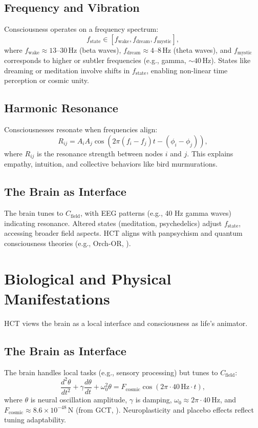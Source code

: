 \documentclass[a4paper,12pt]{article}
\begin{document}
\subsection{Frequency and Vibration}
Consciousness operates on a frequency spectrum:
\begin{equation}
f_{\text{state}} \in [f_{\text{wake}}, f_{\text{dream}}, f_{\text{mystic}}],
\label{eq:freq_spectrum}
\end{equation}
where $f_{\text{wake}} \approx 13\text{--}30 \, \text{Hz}$ (beta waves), $f_{\text{dream}} \approx 4\text{--}8 \, \text{Hz}$ (theta waves), and $f_{\text{mystic}}$ corresponds to higher or subtler frequencies (e.g., gamma, $\sim 40 \, \text{Hz}$). States like dreaming or meditation involve shifts in $f_{\text{state}}$, enabling non-linear time perception or cosmic unity.

\subsection{Harmonic Resonance}
Consciousnesses resonate when frequencies align:
\begin{equation}
R_{ij} = A_i A_j \cos(2\pi (f_i - f_j) t - (\phi_i - \phi_j)),
\label{eq:resonance}
\end{equation}
where $R_{ij}$ is the resonance strength between nodes $i$ and $j$. This explains empathy, intuition, and collective behaviors like bird murmurations.

\subsection{The Brain as Interface}
The brain tunes to $C_{\text{field}}$, with EEG patterns (e.g., 40 Hz gamma waves) indicating resonance. Altered states (meditation, psychedelics) adjust $f_{\text{state}}$, accessing broader field aspects. HCT aligns with panpsychism and quantum consciousness theories (e.g., Orch-OR, \cite{PenroseHameroff1996}).

\section{Biological and Physical Manifestations}
\label{sec:bio_phys}
HCT views the brain as a local interface and consciousness as life’s animator.

\subsection{The Brain as Interface}
The brain handles local tasks (e.g., sensory processing) but tunes to $C_{\text{field}}$:
\begin{equation}
\frac{d^2 \theta}{dt^2} + \gamma \frac{d \theta}{dt} + \omega_0^2 \theta = F_{\text{cosmic}} \cos(2\pi \cdot 40 \, \text{Hz} \cdot t),
\label{eq:neural_resonance}
\end{equation}
where $\theta$ is neural oscillation amplitude, $\gamma$ is damping, $\omega_0 \approx 2\pi \cdot 40 \, \text{Hz}$, and $F_{\text{cosmic}} \approx 8.6 \times 10^{-48} \, \text{N}$ (from GCT, \cite{Wright2025GCT}). Neuroplasticity and placebo effects reflect tuning adaptability.
\end{document}

